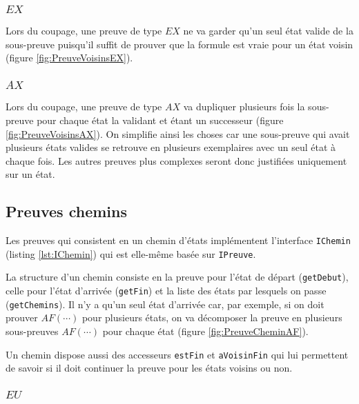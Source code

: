 \documentclass[dvipsnames]{report}
\begin{document}
\subsubsection{$EX$}

Lors du coupage, une preuve de type $EX$ ne va garder qu'un seul état valide de la sous-preuve puisqu'il suffit de prouver que la formule est vraie pour un état voisin (figure \ref{fig:PreuveVoisinsEX}).



\subsubsection{$AX$}

Lors du coupage, une preuve de type $AX$ va dupliquer plusieurs fois la sous-preuve pour chaque état la validant et étant un successeur (figure \ref{fig:PreuveVoisinsAX}). On simplifie ainsi les choses car une sous-preuve qui avait plusieurs états valides se retrouve en plusieurs exemplaires avec un seul état à chaque fois. Les autres preuves plus complexes seront donc justifiées uniquement sur un état.



\subsection{Preuves chemins}

Les preuves qui consistent en un chemin d'états implémentent l'interface \texttt{IChemin} (listing \ref{lst:IChemin}) qui est elle-même basée sur \texttt{IPreuve}.

La structure d'un chemin consiste en la preuve pour l'état de départ (\texttt{getDebut}), celle pour l'état d'arrivée (\texttt{getFin}) et la liste des états par lesquels on passe (\texttt{getChemins}). Il n'y a qu'un seul état d'arrivée car, par exemple, si on doit prouver $AF(\cdots)$ pour plusieurs états, on va décomposer la preuve en plusieurs sous-preuves $AF(\cdots)$ pour chaque état (figure \ref{fig:PreuveCheminAF}).



Un chemin dispose aussi des accesseurs \texttt{estFin} et \texttt{aVoisinFin} qui lui permettent de savoir si il doit continuer la preuve pour les états voisins ou non.

\subsubsection{$EU$}
\end{document}
